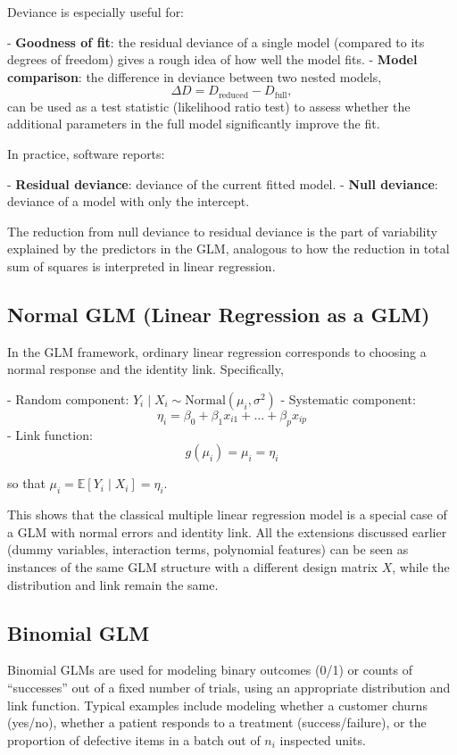 Deviance is especially useful for:

- \textbf{Goodness of fit}: the residual deviance of a single model (compared to its degrees of freedom) gives a rough idea of how well the model fits.  
- \textbf{Model comparison}: the difference in deviance between two nested models,
  \[
  \Delta D = D_{\text{reduced}} - D_{\text{full}},
  \]
  can be used as a test statistic (likelihood ratio test) to assess whether the additional parameters in the full model significantly improve the fit.

In practice, software reports:

- \textbf{Residual deviance}: deviance of the current fitted model.  
- \textbf{Null deviance}: deviance of a model with only the intercept.  

The reduction from null deviance to residual deviance is the part of variability explained by the predictors in the GLM, analogous to how the reduction in total sum of squares is interpreted in linear regression.



\subsection{Normal GLM (Linear Regression as a GLM)}

In the GLM framework, ordinary linear regression corresponds to choosing a normal response and the identity link. Specifically,

- Random component:
  $Y_i \mid X_i \sim \text{Normal}(\mu_i, \sigma^2)$
- Systematic component:
  \[
  \eta_i = \beta_0 + \beta_1 x_{i1} + \dots + \beta_p x_{ip}
  \]
- Link function:
  \[
  g(\mu_i) = \mu_i = \eta_i
  \]

so that $\mu_i = \mathbb{E}[Y_i \mid X_i] = \eta_i$.

This shows that the classical multiple linear regression model is a special case of a GLM with normal errors and identity link. All the extensions discussed earlier (dummy variables, interaction terms, polynomial features) can be seen as instances of the same GLM structure with a different design matrix $X$, while the distribution and link remain the same.



\subsection{Binomial GLM}

Binomial GLMs are used for modeling binary outcomes (0/1) or counts of “successes” out of a fixed number of trials, using an appropriate distribution and link function. Typical examples include modeling whether a customer churns (yes/no), whether a patient responds to a treatment (success/failure), or the proportion of defective items in a batch out of $n_i$ inspected units.



